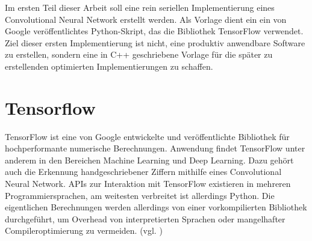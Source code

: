 \documentclass[../main.tex]{subfiles}
\begin{document}
Im ersten Teil dieser Arbeit soll eine rein seriellen Implementierung eines Convolutional Neural Network erstellt werden. Als Vorlage dient ein ein von Google veröffentlichtes Python-Skript, das die Bibliothek TensorFlow verwendet. Ziel dieser ersten Implementierung ist nicht, eine produktiv anwendbare Software zu erstellen, sondern eine in C++ geschriebene Vorlage für die später zu erstellenden optimierten Implementierungen zu schaffen. 
\section{Tensorflow}
TensorFlow ist eine von Google entwickelte und veröffentlichte Bibliothek für hochperformante numerische Berechnungen. Anwendung findet TensorFlow unter anderem in den Bereichen Machine Learning und Deep Learning. Dazu gehört auch die Erkennung handgeschriebener Ziffern mithilfe eines Convolutional Neural Network. APIs zur Interaktion mit TensorFlow existieren in mehreren Programmiersprachen, am weitesten verbreitet ist allerdings Python. Die eigentlichen Berechnungen werden allerdings von einer vorkompilierten Bibliothek durchgeführt, um Overhead von interpretierten Sprachen oder mangelhafter Compileroptimierung zu vermeiden. (vgl. \cite{tensorflowTutorial2})
\end{document}
